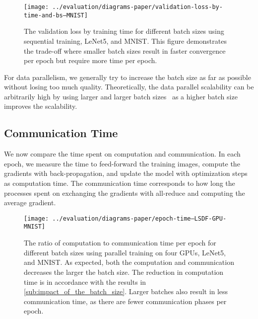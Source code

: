 \documentclass[conference]{IEEEtran}
\begin{document}
\begin{figure}[ht]
\centering
\texttt{[image: ../evaluation/diagrams-paper/validation-loss-by-time-and-bs--MNIST]}
\caption{The validation loss by training time for different batch sizes using sequential training, LeNet5, and MNIST.
This figure demonstrates the trade-off where smaller batch sizes result in faster convergence per epoch but require more time per epoch.}
\label{fig:loss_by_time}
\end{figure}

For data parallelism, we generally try to increase the batch size as far as possible without losing too much quality.
Theoretically, the data parallel scalability can be arbitrarily high by using larger and larger batch sizes~\cite{krizhevsky2014-One-weird-trick} as a higher batch size improves the scalability.


\subsection{Communication Time} %
\label{sub:communication_time}

We now compare the time spent on computation and communication.
In each epoch, we measure the time to feed-forward the training images, compute the gradients with back-propagation, and update the model with optimization steps as computation time.
The communication time corresponds to how long the processes spent on exchanging the gradients with all-reduce and computing the average gradient.

\begin{figure}[ht]
\centering
\texttt{[image: ../evaluation/diagrams-paper/epoch-time--LSDF-GPU-MNIST]}
\caption{The ratio of computation to communication time per epoch for different batch sizes using parallel training on four GPUs, LeNet5, and MNIST.
As expected, both the computation and communication decreases the larger the batch size.
The reduction in computation time is in accordance with the results in \autoref{sub:impact_of_the_batch_size}.
Larger batches also result in less communication time, as there are fewer communication phases per epoch.}
\label{fig:comm_time_by_batch_size}
\end{figure}
\end{document}
